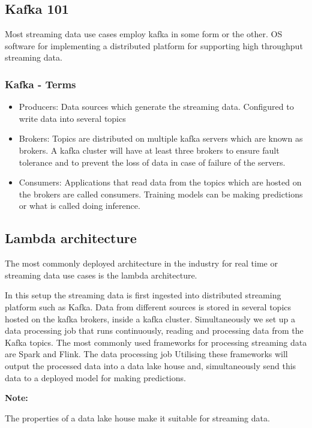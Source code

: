 \documentclass[a4paper, 11pt]{book}
\newenvironment{note}{
    \begin{siderule}
        \textbf{Note: }
        }{
    \end{siderule}}
\begin{document}
    \subsection{Kafka 101}

    Most streaming data use cases employ kafka in some form or the other.
    OS software for implementing a distributed platform for supporting high throughput streaming data.

    \subsubsection{Kafka - Terms}
    \begin{itemize}
        \item Producers: Data sources which generate the streaming data. Configured to write data into several topics
        \item Brokers: Topics are distributed on multiple kafka servers which are known as brokers. A kafka cluster will have at least three brokers to ensure fault tolerance and to prevent the loss of data in case of failure of the servers.
        \item Consumers: Applications that read data from the topics which are hosted on the brokers are called consumers. Training models can be making predictions or what is called doing inference.
    \end{itemize}

    \subsection{Lambda architecture}
    The most commonly deployed architecture in the industry for real time or streaming data use cases is the lambda architecture.

    In this setup the streaming data is first ingested into distributed streaming platform such as Kafka.
    Data from different sources is stored in several topics hosted on the kafka brokers, inside a kafka cluster.
    Simultaneously we set up a data processing job that runs continuously, reading and processing data from the Kafka topics.
    The most commonly used frameworks for processing streaming data are Spark and Flink.
    The data processing job Utilising these frameworks will output the processed data into a data lake house and, simultaneously send this data to a deployed model for making predictions.

    \begin{note}
        The properties of a data lake house make it suitable for streaming data.
    \end{note}
\end{document}
